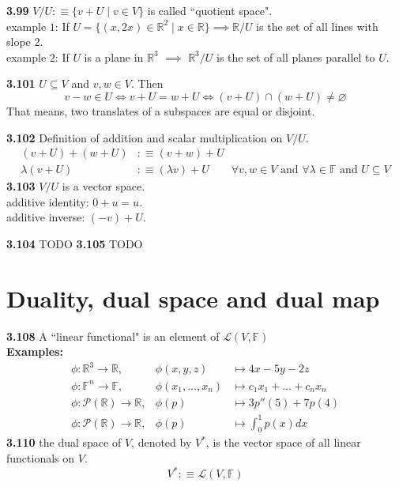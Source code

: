\setcounter{thm}{98}
\textbf{3.99} $V/U :\equiv \{v+U \mid v\in V\}$ is called ``quotient space".\\
example $1$: If $U=\{ (x,2x)\in \mathbb{R}^2 \mid x\in \mathbb{R} \} \implies \mathbb{R}/U$ is the set of all lines with slope $2$.  \\
example $2$: If $U$ is a plane in $\mathbb{R}^3$ $\implies$ $\mathbb{R}^3/U$ is the set of all planes parallel to $U$.

\setcounter{thm}{100}
\textbf{3.101} $ U \subseteq V$ and $v,w\in V$. Then
$$v-w \in U \iff v+U = w + U \iff (v+U) \cap (w+U) \neq \varnothing$$
That means, two translates of a subspaces are equal or disjoint.

\textbf{3.102} Definition of addition and scalar multiplication on $V/U$.
\begin{equation}
	\begin{aligned}
		(v+U)+(w+U) & :\equiv (v+w) + U \\
		\lambda (v+U) & :\equiv (\lambda v) + U \qquad \forall v,w \in V \text{ and } \forall \lambda \in \mathbb{F} 
		\text{ and } U \subseteq V
	\end{aligned}
\end{equation} 
\textbf{3.103} $V/U$ is a vector space. \\
additive identity: $0+u = u$. \\
additive inverse: $(-v)+U$.

\textbf{3.104} TODO \textbf{3.105} TODO

\section{Duality, dual space and dual map}
\textbf{3.108} A ``linear functional" is an element of $\mathcal{L}(V, \mathbb{F})$\\
\textbf{Examples:} 
\begin{equation} 
	\begin{array}{lll}
		\phi: \mathbb{R}^3  \to \mathbb{R}, &\phi (x,y,z)  & \mapsto 4x-5y-2z \\
		\phi: \mathbb{F}^n  \to \mathbb{F}, &\phi (x_1, \dots, x_n)
		& \mapsto c_1x_1 + \dots + c_nx_n  \\
		\phi: \mathcal{P} (\mathbb{R})  \to \mathbb{R},
		& \phi(p) & \mapsto 3p''(5) + 7p(4) \\
		\phi: \mathcal{P}(\mathbb{R}) \to \mathbb{R}, 
		& \phi(p)  &\mapsto \textstyle \int_{0}^{1} p(x) dx
	\end{array}
\end{equation}
\textbf{3.110}
the dual space of $V$, denoted by $V^{*}$, is the vector space of all linear functionals on $V$.
$$V^{*} :\equiv \mathcal{L}(V, \mathbb {F})$$

